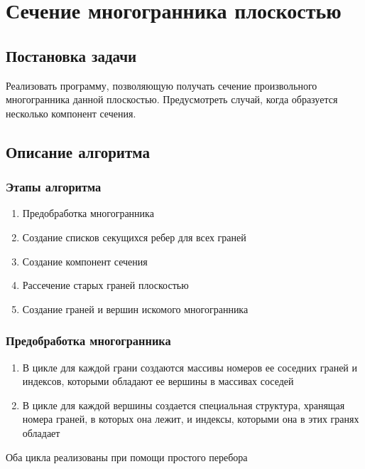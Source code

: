 \documentclass[a4paper,12pt, titlepage]{article}
\begin{document}




\newpage
\section{Сечение многогранника плоскостью}

\subsection{Постановка задачи}
\begin{flushleft}
	Реализовать программу, позволяющую получать сечение произвольного многогранника
	данной плоскостью. Предусмотреть случай, когда образуется несколько компонент сечения.
\end{flushleft}

\subsection{Описание алгоритма}

\subsubsection{Этапы алгоритма}
	\begin{flushleft}
		\begin{enumerate}
			\item Предобработка многогранника
			\item Создание списков секущихся ребер для всех граней
			\item Создание компонент сечения
			\item Рассечение старых граней плоскостью
			\item Создание граней и вершин искомого многогранника
		\end{enumerate}
	\end{flushleft}

\subsubsection{Предобработка многогранника}
	\begin{flushleft}
		\begin{enumerate}
			\item В цикле для каждой грани создаются массивы номеров ее соседних граней и 
			индексов, которыми обладают ее вершины в массивах соседей
			\item В цикле для каждой вершины создается специальная структура, хранящая 
			номера граней, в которых она лежит, и индексы, которыми она в этих гранях 
			обладает
		\end{enumerate}
	\end{flushleft}
	\begin{flushleft}
		Оба цикла реализованы при помощи простого перебора
	\end{flushleft}
\end{document}
